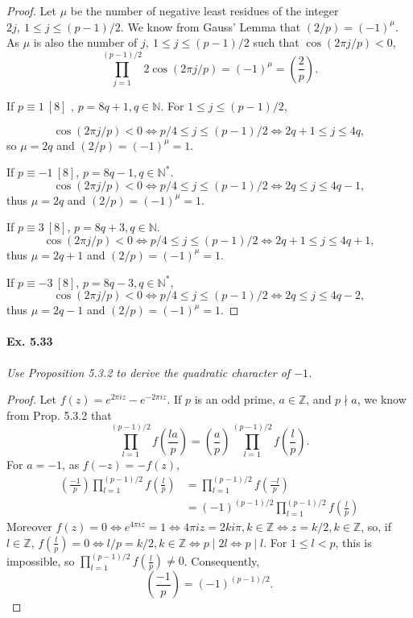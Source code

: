\documentclass[11pt,a4paper]{article}
\newcommand{\Z}{\mathbb{Z}}
\newcommand{\N}{\mathbb{N}}
\newcommand{\legendre}[2]{\genfrac{(}{)}{}{}{#1}{#2}}
\begin{document}
\begin{proof}
Let $\mu$ be the number of negative least residues of the integer $2j,\ 1 \leq j \leq (p-1)/2 $. We know from Gauss' Lemma that $(2/p) = (-1)^\mu$. As $\mu$ is also the number of $j,\ 1 \leq j \leq (p-1)/2$ such that $\cos (2\pi j/p)<0$,
$$ \prod_{j=1}^{(p-1)/2} 2 \cos(2\pi j/p) = (-1)^\mu = \legendre{2}{p}.$$

If $p \equiv 1\ [8]$ , $p = 8q +1, q \in \N$. For $1 \leq j \leq (p-1)/2$,

$$\cos (2\pi j/p) < 0 \iff p/4\leq j \leq (p-1)/2 \iff 2q +1 \leq j \leq 4q,$$ so $\mu =2q$ and $(2/p) = (-1)^\mu = 1$.

If $p\equiv -1 \ [8]$, $p = 8q - 1, q \in \N^*$.
$$\cos (2\pi j/p) < 0 \iff p/4\leq j \leq (p-1)/2 \iff 2q \leq j \leq 4q -1,$$
 thus $\mu =2q$ and $(2/p) = (-1)^\mu = 1$.
 
 If $p \equiv 3 \ [8]$, $p = 8q + 3, q \in \N$.
 $$\cos (2\pi j/p) < 0 \iff p/4\leq j \leq (p-1)/2 \iff 2q + 1 \leq j \leq 4q +1,$$
  thus $\mu =2q+1$ and $(2/p) = (-1)^\mu = 1$.
  
  If $p \equiv -3 \ [8]$, $p = 8q - 3, q \in \N^*$,
  $$\cos (2\pi j/p) < 0 \iff p/4\leq j \leq (p-1)/2 \iff 2q  \leq j \leq 4q -2,$$
  thus $\mu =2q-1$ and $(2/p) = (-1)^\mu = 1$.
\end{proof}

\paragraph{Ex. 5.33}

{\it Use Proposition 5.3.2 to derive the quadratic character of $-1$.
}

\begin{proof}
Let $f(z) = e^{2\pi i z}- e^{-2\pi i z}$. If $p$ is an odd prime, $a \in \Z$, and $p\nmid a$, we know from Prop. 5.3.2 that
$$\prod_{l=1}^{(p-1)/2} f\left(\frac{la}{p} \right) = \legendre{a}{p} \prod_{l=1}^{(p-1)/2} f\left( \frac{l}{p} \right).$$
For $a = -1$, as $f(-z) = -f(z)$, 
\begin{align*}
\legendre{-1}{p} \prod_{l=1}^{(p-1)/2} f\left( \frac{l}{p} \right) &= \prod_{l=1}^{(p-1)/2} f\left(\frac{-l}{p} \right)\\
&=(-1)^{(p-1)/2} \prod_{l=1}^{(p-1)/2} f\left( \frac{l}{p} \right)
\end{align*}
Moreover $f(z) = 0 \iff e^{4\pi i z} = 1 \iff 4\pi i z = 2 k i \pi, k \in \Z \iff z = k/2, k\in \Z$, so, if $l \in \Z$,
$f\left( \frac{l}{p} \right) = 0 \iff l/p = k/2, k \in \Z \iff p \mid 2l \iff p \mid l$. For $1\leq l <p$, this is impossible, so $\prod_{l=1}^{(p-1)/2} f\left( \frac{l}{p} \right) \ne 0$. Consequently,
$$\legendre{-1}{p} = (-1)^{(p-1)/2}.$$
\end{proof}
\end{document}

